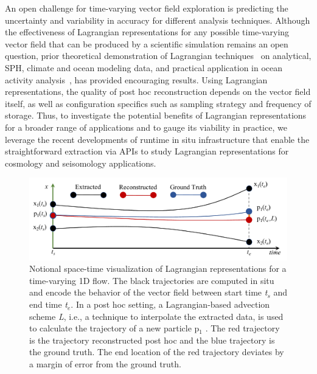 \documentclass[runningheads]{llncs}
\begin{document}
An open challenge for time-varying vector field exploration is predicting the uncertainty and variability in accuracy for different analysis techniques.
%
Although the effectiveness of Lagrangian representations for any possible time-varying vector field that can be produced by a scientific simulation remains an open question, prior theoretical demonstration of Lagrangian techniques~\cite{agranovsky2014improved}\cite{chandler2015interpolation}\cite{bujack2015lagrangian}\cite{chandler2016analysis}\cite{hummel2016error}\cite{sane2018revisiting}\cite{sane2019interpolation}\cite{rapp2019void}\cite{Jakob20} on analytical, SPH, climate and ocean modeling data, and practical application in ocean activity analysis~\cite{siegfried2019tropical}, has provided encouraging results.
%
Using Lagrangian representations, the quality of post hoc reconstruction depends on the vector field itself, as well as configuration specifics such as sampling strategy and frequency of storage.
%
Thus, to investigate the potential benefits of Lagrangian representations for a broader range of applications and to gauge its viability in practice, we leverage the recent developments of runtime in situ infrastructure that enable the straightforward extraction via APIs to study Lagrangian representations for cosmology and seisomology applications.

\begin{figure}[!t]
\centering
\includegraphics[width=0.85\linewidth]{sample.pdf}
\vspace{-3mm}
\caption{Notional space-time visualization of Lagrangian representations for a time-varying 1D flow. The black trajectories are computed in situ and encode the behavior of the vector field between start time \textit{t$_{s}$} and end time \textit{t$_{e}$}. In a post hoc setting, a Lagrangian-based advection scheme \textit{L}, i.e., a technique to interpolate the extracted data, is used to calculate the trajectory of a new particle p$_{1}$ . The red trajectory is the trajectory reconstructed post hoc and the blue trajectory is the ground truth. The end location of the red trajectory deviates by a margin of error from the ground truth.}
\vspace{-8mm}
\label{fig:sample}
\end{figure}
\end{document}
